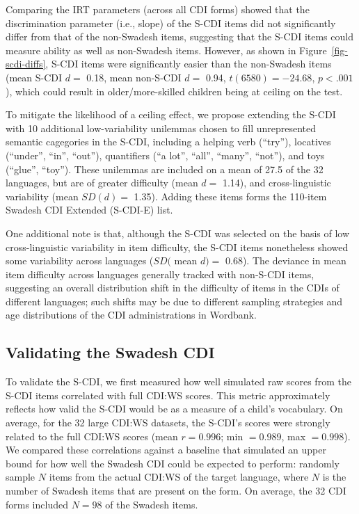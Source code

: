 \documentclass[
  letterpaper,
  DIV=11,
  numbers=noendperiod]{scrartcl}
\begin{document}
Comparing the IRT parameters (across all CDI forms) showed that the
discrimination parameter (i.e., slope) of the S-CDI items did not
significantly differ from that of the non-Swadesh items, suggesting that
the S-CDI items could measure ability as well as non-Swadesh items.
However, as shown in Figure~\ref{fig-scdi-diffs}, S-CDI items were
significantly easier than the non-Swadesh items (mean S-CDI \(d=\) 0.18,
mean non-S-CDI \(d=\) 0.94, \(t(6580) = -24.68\), \(p < .001\)), which
could result in older/more-skilled children being at ceiling on the
test.

To mitigate the likelihood of a ceiling effect, we propose extending the
S-CDI with 10 additional low-variability unilemmas chosen to fill
unrepresented semantic cagegories in the S-CDI, including a helping verb
(``try''), locatives (``under'', ``in'', ``out''), quantifiers (``a
lot'', ``all'', ``many'', ``not''), and toys (``glue'', ``toy''). These
unilemmas are included on a mean of 27.5 of the 32 languages, but are of
greater difficulty (mean \(d=\) 1.14), and cross-linguistic variability
(mean \(SD(d)=\) 1.35). Adding these items forms the 110-item Swadesh
CDI Extended (S-CDI-E) list.

One additional note is that, although the S-CDI was selected on the
basis of low cross-linguistic variability in item difficulty, the S-CDI
items nonetheless showed some variability across languages (\(SD(\) mean
\(d)=\) 0.68). The deviance in mean item difficulty across languages
generally tracked with non-S-CDI items, suggesting an overall
distribution shift in the difficulty of items in the CDIs of different
languages; such shifts may be due to different sampling strategies and
age distributions of the CDI administrations in Wordbank.

\subsection{Validating the Swadesh
CDI}\label{validating-the-swadesh-cdi}

To validate the S-CDI, we first measured how well simulated raw scores
from the S-CDI items correlated with full CDI:WS scores. This metric
approximately reflects how valid the S-CDI would be as a measure of a
child's vocabulary. On average, for the 32 large CDI:WS datasets, the
S-CDI's scores were strongly related to the full CDI:WS scores (mean
\(r=0.996\); min \(=0.989\), max \(=0.998\)). We compared these
correlations against a baseline that simulated an upper bound for how
well the Swadesh CDI could be expected to perform: randomly sample \(N\)
items from the actual CDI:WS of the target language, where \(N\) is the
number of Swadesh items that are present on the form. On average, the 32
CDI forms included \(N=98\) of the Swadesh items.
\end{document}
